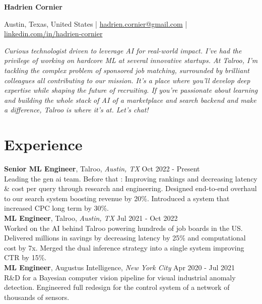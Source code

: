 \documentclass[a4paper,9pt]{article}
\begin{document}
\pagestyle{empty}

\centerline{\huge \textbf{Hadrien Cornier}}

\vspace{2mm}

\centerline{Austin, Texas, United States | \href{mailto:hadrien.cornier@gmail.com}{hadrien.cornier@gmail.com} | \href{https://linkedin.com/in/hadrien-cornier}{linkedin.com/in/hadrien-cornier}}

\vspace{4mm}

\noindent\textit{Curious technologist driven to leverage AI for real-world impact. I've had the privilege of working on hardcore ML at several innovative startups. At Talroo, I'm tackling the complex problem of sponsored job matching, surrounded by brilliant colleagues all contributing to our mission. It's a place where you'll develop deep expertise while shaping the future of recruiting. If you're passionate about learning and building the whole stack of AI of a marketplace and search backend and make a difference, Talroo is where it's at. Let's chat!}

\vspace{4mm}

\section*{Experience}

\noindent\textbf{Senior ML Engineer}, Talroo, \textit{Austin, TX} \hfill Oct 2022 - Present\\
Leading the gen ai team. Before that : Improving rankings and decreasing latency \& cost per query through research and engineering. Designed end-to-end overhaul to our search system boosting revenue by 20\%. Introduced a system that increased CPC long term by 30\%.\\    

\noindent\textbf{ML Engineer}, Talroo, \textit{Austin, TX} \hfill Jul 2021 - Oct 2022\\
    Worked on the AI behind Talroo powering hundreds of job boards in the US. Delivered millions in savings by decreasing latency by 25\% and computational cost by 7x. Merged the dual inference strategy into a single system improving CTR by 15\%.\\

    \noindent\textbf{ML Engineer}, Augustus Intelligence, \textit{New York City} \hfill Apr 2020 - Jul 2021\\
    R\&D for a Bayesian computer vision pipeline for visual industrial anomaly detection. Engineered full redesign for the control system of a network of thousands of sensors.\\
\end{document}
